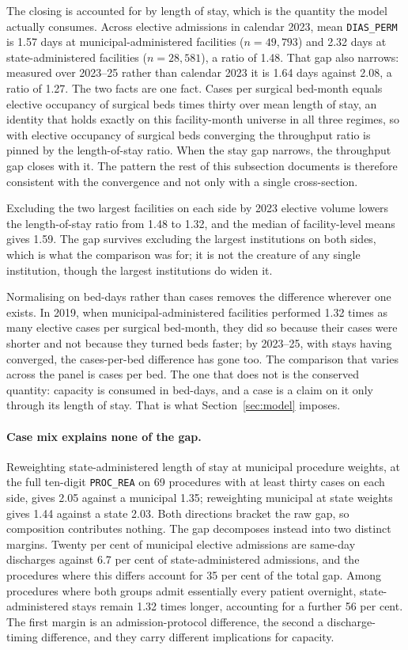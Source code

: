 The closing is accounted for by length of stay, which is the quantity the model
actually consumes. Across elective admissions in calendar 2023, mean
\texttt{DIAS\_PERM} is 1.57 days at municipal-administered facilities
($n=49{,}793$) and 2.32 days at state-administered facilities ($n=28{,}581$), a
ratio of 1.48. That gap also narrows: measured over 2023--25 rather than calendar
2023 it is 1.64 days against 2.08, a ratio of 1.27. The two facts are one fact.
Cases per surgical bed-month equals elective occupancy of surgical beds times
thirty over mean length of stay, an identity that holds exactly on this
facility-month universe in all three regimes, so with elective occupancy of
surgical beds converging the throughput ratio is pinned by the length-of-stay
ratio. When the stay gap narrows, the throughput gap closes with it. The
pattern the rest of this subsection documents is therefore consistent with the
convergence and not only with a single cross-section.

Excluding the two largest facilities on each side by 2023 elective volume lowers
the length-of-stay ratio from 1.48 to 1.32, and the median of facility-level
means gives 1.59. The gap survives excluding the largest institutions on both
sides, which is what the comparison was for; it is not the creature of any single
institution, though the largest institutions do widen it.

Normalising on bed-days rather than cases removes the difference wherever one
exists. In 2019, when municipal-administered facilities performed 1.32 times as
many elective cases per surgical bed-month, they did so because their cases were
shorter and not because they turned beds faster; by 2023--25, with stays having
converged, the cases-per-bed difference has gone too. The comparison that varies
across the panel is cases per bed. The one that does not is the conserved
quantity: capacity is consumed in bed-days, and a case is a claim on it only
through its length of stay. That is what Section~\ref{sec:model} imposes.

\paragraph{Case mix explains none of the gap.} Reweighting state-administered
length of stay at municipal procedure weights, at the full ten-digit
\texttt{PROC\_REA} on 69 procedures with at least thirty cases on each side,
gives 2.05 against a municipal 1.35; reweighting municipal at state weights
gives 1.44 against a state 2.03. Both directions bracket the raw gap, so
composition contributes nothing. The gap decomposes instead into two distinct
margins. Twenty per cent of municipal elective admissions are same-day
discharges against 6.7 per cent of state-administered admissions, and the
procedures where this differs account for 35 per cent of the total gap. Among
procedures where both groups admit essentially every patient overnight,
state-administered stays remain 1.32 times longer, accounting for a further 56
per cent. The first margin is an admission-protocol difference, the second a
discharge-timing difference, and they carry different implications for capacity.

